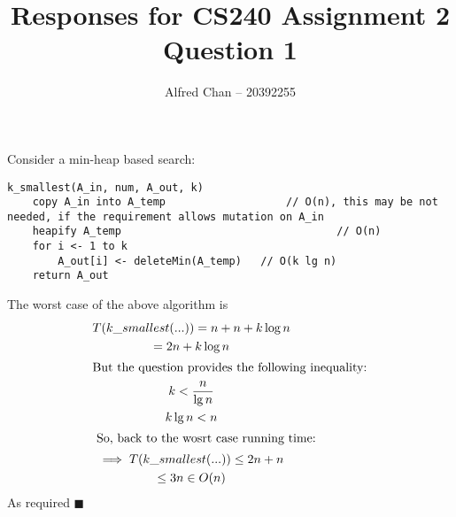 \documentclass[12pt]{article}
\title{Responses for CS240 Assignment 2 Question 1}
\author{Alfred Chan -- 20392255}
\begin{document}
\maketitle
{}

Consider a min-heap based search:\\

\begin{lstlisting}
k_smallest(A_in, num, A_out, k) 
	copy A_in into A_temp 					// O(n), this may be not needed, if the requirement allows mutation on A_in
	heapify A_temp 									// O(n)
	for i <- 1 to k
		A_out[i] <- deleteMin(A_temp)	// O(k lg n)
	return A_out
\end{lstlisting}
The worst case of the above algorithm is
\begin{gather*}
T(k\_smallest(...)) = n + n + k\log n\\
= 2n + k\log n\\
\intertext{But the question provides the following inequality:}
k < \frac{n}{\lg n}\\
k \lg n < n\\
\intertext{ So, back to the wosrt case running time:}
\implies T(k\_smallest(...)) \le 2n + n\\
\le 3n \in O(n)
\end{gather*}
As required
\hfill $\blacksquare$
\end{document}
